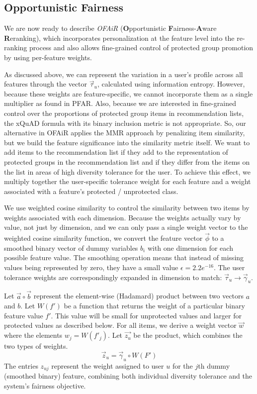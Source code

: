 \subsection{Opportunistic Fairness}
\label{subsec:ofair_opp_fair}

We are now ready to describe \textit{OFAiR} (\textbf{O}pportunistic \textbf{F}airness-\textbf{A}ware \textbf{R}eranking), which incorporates personalization at the feature level into the re-ranking process and also allows fine-grained control of protected group promotion by using per-feature weights. 

As discussed above, we can represent the variation in a user's profile across all features through the vector $\vec{\tau}_u$, calculated using information entropy. However, because these weights are feature-specific, we cannot incorporate them as a single multiplier as found in PFAR. Also, because we are interested in fine-grained control over the proportions of protected group items in recommendation lists, the xQuAD formula with its binary inclusion metric is not appropriate. So, our alternative in OFAiR applies the MMR approach by penalizing item similarity, but we build the feature significance into the similarity metric itself. We want to add items to the recommendation list if they add to the representation of protected groups in the recommendation list and if they differ from the items on the list in areas of high diversity tolerance for the user. To achieve this effect, we multiply together the user-specific tolerance weight for each feature and a weight associated with a feature's protected / unprotected class. 

We use weighted cosine similarity to control the similarity between two items by weights associated with each dimension. Because the weights actually vary by value, not just by dimension, and we can only pass a single weight vector to the weighted cosine similarity function, we convert the feature vector $\vec{\phi}$ to a smoothed binary vector of dummy variables $b_i$ with one dimension for each possible feature value. The smoothing operation means that instead of missing values being represented by zero, they have a small value $\epsilon = 2.2e^{-16}$. The user tolerance weights are correspondingly expanded in dimension to match: $\vec{\tau}_u \rightarrow \vec{\gamma}_u$. 

Let $\vec{a} \circ \vec{b}$ represent the element-wise (Hadamard) product between two vectors $a$ and $b$. Let $W(f')$ be a function that returns the weight of a particular binary feature value $f'$. This value will be small for unprotected values and larger for protected values as described below. For all items, we derive a weight vector $\vec{w}$ where the elements $w_j = W(f'_{j})$. Let $\vec{z_{u}}$ be the product, which combines the two types of weights. %
\begin{equation}
\vec{z}_u = \vec{\gamma}_u \circ W(F')
\end{equation}
The entries $z_{uj}$ represent the weight assigned to user $u$ for the $j$th dummy (smoothed binary) feature, combining both individual diversity tolerance and the system's fairness objective.

